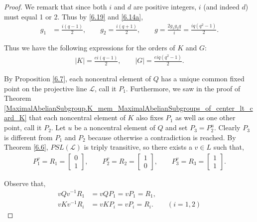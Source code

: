 \begin{proof}
We remark that since both $i$ and $d$ are positive integers, $i$ (and indeed $d$) must equal 1 or 2. Thus by \eqref{6.19} and \eqref{6.14a},
\begin{align*} g_1 &= \frac{i(q-1)}{2}, \qquad g_2 = \frac{i(q + 1)}{2}, \qquad g = \frac{2 g_1 g_2 q}{i} = \frac{iq(q^2 - 1)}{2}.
\end{align*}

Thus we have the following expressions for the orders of $K$ and $G$:
\begin{align}\label{orderGK} |K| = \frac{ei(q-1)}{2}, \qquad |G| = \frac{eiq(q^2-1)}{2}.
\end{align}

By Proposition \ref{6.7}, each noncentral element of $Q$ has a unique common fixed point on the projective line $\mathscr{L}$, call it $P_1$. Furthermore, we saw in the proof of Theorem \ref{MaximalAbelianSubgroup.K_mem_MaximalAbelianSubgroups_of_center_lt_card_K} that each noncentral element of $K$ also fixes $P_1$ as well as one other point, call it $P_2$. Let $u$ be a noncentral element of $Q$ and set $P_3 = P_2^u$. Clearly $P_3$ is different from $P_1$ and $P_2$ because otherwise a contradiction is reached. By Theorem \ref{6.6}, $PSL(\mathscr{L})$ is triply transitive, so there exists a $v \in L$ such that,
\begin{align*} P_1^v = R_1 = \begin{bmatrix} 0 \\ 1 \end{bmatrix}, \qquad P_2^v = R_2 = \begin{bmatrix} 1 \\ 0 \end{bmatrix}, \qquad P_3^v = R_3 = \begin{bmatrix} 1 \\ 1 \end{bmatrix}.
\end{align*} 

Observe that,
\begin{align*} vQv^{-1}R_1 &= vQP_1 = vP_1 = R_1,
\\ vKv^{-1}R_i &= vKP_i = vP_i = R_i. \qquad (i=1,2)
\end{align*} 


\end{proof}

